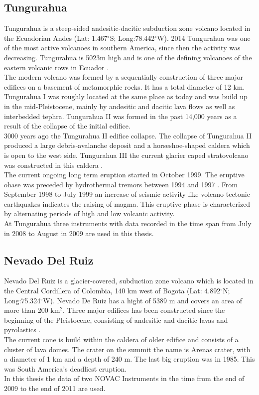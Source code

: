 \documentclass  [
  paper    = a4,
  BCOR     = 10mm,
  twoside,
  fontsize = 12pt,
  fleqn,
  toc      = bibnumbered,
  toc      = listofnumbered,
  numbers  = noendperiod,
  headings = normal,
  listof   = leveldown,
  version  = 3.03
]                                       {scrreprt}
\begin{document}
	\subsection*{Tungurahua \label{Tung}}
	Tungurahua is a steep-sided andesitic-dacitic subduction zone volcano located in the Ecuadorian Andes (Lat: 1.467$^{\circ}$S; Long:78.442$^{\circ}$W). 2014 Tungurahua was one of the most active volcanoes in southern America, since then the activity was decreasing. Tungurahua is 5023m high and is one of the defining volcanoes of the eastern volcanic rows in Ecuador \citep{hall1999tungurahua}.
	\\
	The modern volcano was formed by a sequentially construction of three major edifices on a basement of metamorphic rocks. It has a total diameter of 12 km. Tungurahua I was roughly located at the same place as today and was build up in the mid-Pleistocene, mainly by andesitic and dacitic lava flows as well as interbedded tephra. Tungurahua II was formed in the past 14,000 years as a result of the collapse of the initial edifice.\\
	3000 years ago the Tungurahua II edifice collapse. The collapse of Tungurahua II produced a large debris-avalanche deposit and a horseshoe-shaped caldera which is open to the west side. Tungurahua III the current glacier caped stratovolcano was constructed in this caldera \citep{GlobalVolcanismProgram}.\\
	The current ongoing long term eruption started in October 1999. The eruptive ohase was preceded by hydrothermal tremors between 1994 and 1997 \citep{samaniego}.
	From September 1998 to July 1999 an increase of seismic activity like volcano tectonic earthquakes indicates the raising of magma. This eruptive phase is characterized by alternating periods of high and low volcanic activity. \\
	At Tungurahua three instruments with data recorded in the time span from July in 2008 to August in 2009 are used in this thesis.
		
	\subsection*{Nevado Del Ruiz}
	Nevado Del Ruiz is a glacier-covered, subduction zone volcano which is located in the Central Cordillera of Colombia, 140 km west of Bogota
	(Lat: 4.892$^{\circ}$N; Long:75.324$^{\circ}$W). Nevado De Ruiz has a hight of 5389 m and covers an area of more than 200 km$^2$.
	Three major edifices has been constructed since the beginning of the Pleistocene, consisting of andesitic and dacitic lavas and pyrolastics \citep{GlobalVolcanismProgram}. \\
	The current cone is build within the caldera of older edifice and consists of a cluster of lava domes. The crater on the summit the name is Arenas crater, with a diameter of 1 km and a depth of 240 m. 
	The last big eruption was in 1985. This was South America's deadliest eruption.\\
	In this thesis the data of two NOVAC Instruments in the time from the end of 2009 to the end of 2011 are used. 
\end{document}
